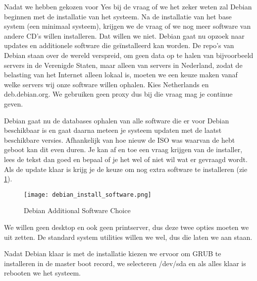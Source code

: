 Nadat we hebben gekozen voor Yes bij de vraag of we het zeker weten zal Debian beginnen met de installatie van het systeem. Na de installatie van het base system (een minimaal systeem), krijgen we de vraag of we nog meer software van andere CD's willen installeren. Dat willen we niet. Debian gaat nu opzoek naar updates en additionele software die ge\"installeerd kan worden. De repo's van Debian staan over de wereld verspreid, om geen data op te halen van bijvoorbeeld servers in de Verenigde Staten, maar alleen van servers in Nederland, zodat de belasting van het Internet alleen lokaal is, moeten we een keuze maken vanaf welke servers wij onze software willen ophalen. Kies Netherlands en deb.debian.org. We gebruiken geen proxy dus bij die vraag mag je continue geven.

Debian gaat nu de databases ophalen van alle software die er voor Debian beschikbaar is en gaat daarna meteen je systeem updaten met de laatst beschikbare versies. Afhankelijk van hoe nieuw de ISO was waarvan de hebt geboot kan dit even duren. Je kan af en toe een vraag krijgen van de installer, lees de tekst dan goed en bepaal of je het wel of niet wil wat er gevraagd wordt. Als de update klaar is krijg je de keuze om nog extra software te installeren (zie \ref{DebSoft}).

\begin{figure}[H]
	\centering
	\texttt{[image: debian\_install\_software.png]}
	\caption{Debian Additional Software Choice}
	\label{DebSoft}
\end{figure}

We willen geen desktop en ook geen printserver, dus deze twee opties moeten we uit zetten. De standard system utilities willen we wel, dus die laten we aan staan.

Nadat Debian klaar is met de installatie kiezen we ervoor om GRUB te installeren in de master boot record, we selecteren /dev/sda en als alles klaar is rebooten we het systeem.
